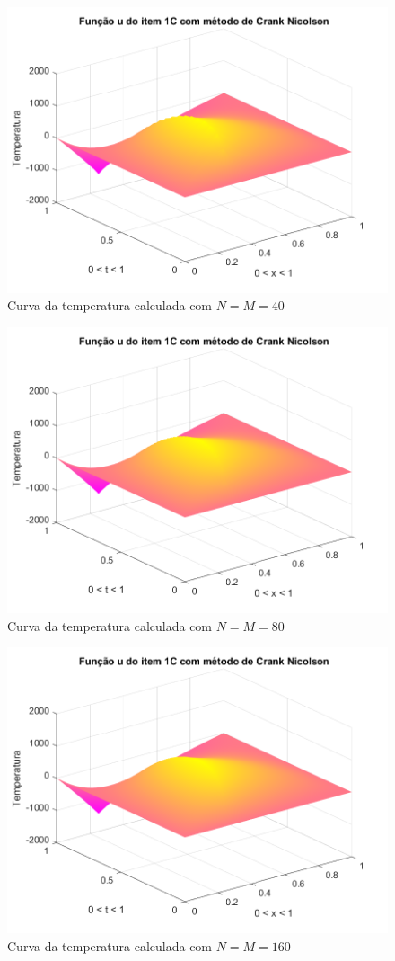 \documentclass[12pt]{article}
\begin{document}
\begin{spacing}{1.5}
\begin{figure}
    \centering
    \includegraphics[width=0.8\linewidth]{Segunda_Tarefa/ItemC/nm40_calculada_C.png}
    \caption{Curva da temperatura calculada com $N=M=40$}
    \label{fig:CC_nm40_calculada}
\end{figure}

\begin{figure}
    \centering
    \includegraphics[width=0.8\linewidth]{Segunda_Tarefa/ItemC/nm80_calculada_C.png}
    \caption{Curva da temperatura calculada com $N=M=80$}
    \label{fig:CC_nm80_calculada}
\end{figure}

\begin{figure}
    \centering
    \includegraphics[width=0.8\linewidth]{Segunda_Tarefa/ItemC/nm160_calculada_C.png}
    \caption{Curva da temperatura calculada com $N=M=160$}
    \label{fig:CC_nm160_calculada}
\end{figure}


\end{spacing}
\end{document}
